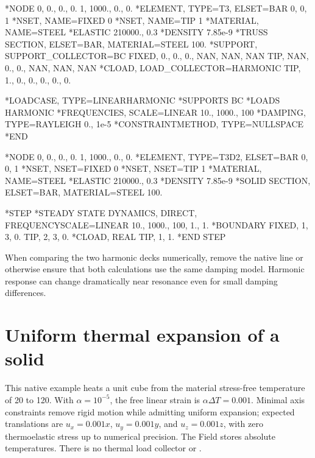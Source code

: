 \begin{dialectexamples}
\begin{femasterdeck}
*NODE
0, 0., 0., 0.
1, 1000., 0., 0.
*ELEMENT, TYPE=T3, ELSET=BAR
0, 0, 1
*NSET, NAME=FIXED
0
*NSET, NAME=TIP
1
*MATERIAL, NAME=STEEL
*ELASTIC
210000., 0.3
*DENSITY
7.85e-9
*TRUSS SECTION, ELSET=BAR, MATERIAL=STEEL
100.
*SUPPORT, SUPPORT_COLLECTOR=BC
FIXED, 0., 0., 0., NAN, NAN, NAN
TIP, NAN, 0., 0., NAN, NAN, NAN
*CLOAD, LOAD_COLLECTOR=HARMONIC
TIP, 1., 0., 0., 0., 0., 0.

*LOADCASE, TYPE=LINEARHARMONIC
*SUPPORTS
BC
*LOADS
HARMONIC
*FREQUENCIES, SCALE=LINEAR
10., 1000., 100
*DAMPING, TYPE=RAYLEIGH
0., 1e-5
*CONSTRAINTMETHOD, TYPE=NULLSPACE
*END
\end{femasterdeck}
\begin{abaqusdeck}
*NODE
0, 0., 0., 0.
1, 1000., 0., 0.
*ELEMENT, TYPE=T3D2, ELSET=BAR
0, 0, 1
*NSET, NSET=FIXED
0
*NSET, NSET=TIP
1
*MATERIAL, NAME=STEEL
*ELASTIC
210000., 0.3
*DENSITY
7.85e-9
*SOLID SECTION, ELSET=BAR, MATERIAL=STEEL
100.

*STEP
*STEADY STATE DYNAMICS, DIRECT,
 FREQUENCYSCALE=LINEAR
10., 1000., 100, 1., 1.
*BOUNDARY
FIXED, 1, 3, 0.
TIP, 2, 3, 0.
*CLOAD, REAL
TIP, 1, 1.
*END STEP
\end{abaqusdeck}
\end{dialectexamples}

When comparing the two harmonic decks numerically, remove the native  line or otherwise ensure that both calculations use the same damping model. Harmonic response can change dramatically near resonance even for small damping differences.

\section{Uniform thermal expansion of a solid}

This native example heats a unit cube from the material stress-free temperature of 20 to 120. With \(\alpha=10^{-5}\), the free linear strain is \(\alpha\Delta T=0.001\). Minimal axis constraints remove rigid motion while admitting uniform expansion; expected translations are \(u_x=0.001x\), \(u_y=0.001y\), and \(u_z=0.001z\), with zero thermoelastic stress up to numerical precision. The Field stores absolute temperatures. There is no thermal load collector or .

